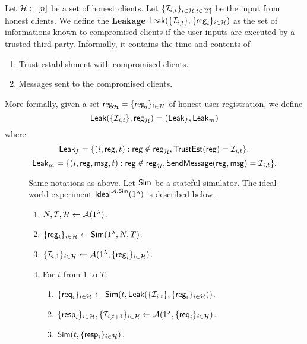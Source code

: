 \begin{definition}[Leakage]
Let $\mathcal{H} \subset [n]$ be a set of honest clients. Let $\{\mathcal{I}_{i, t}\}_{i \in \mathcal{H}, t \in [T]}$ be the input from honest clients. We define the \textbf{Leakage} $\mathsf{Leak}(\{\mathcal{I}_{i, t}\}, \{\mathsf{reg}_{i}\}_{i \in \mathcal{H}})$ as the set of informations known to compromised clients if the user inputs are executed by a trusted third party. Informally, it contains the time and contents of
\begin{enumerate}
    \item Trust establishment with compromised clients.
    \item Messages sent to the compromised clients.
\end{enumerate}
More formally, given a set $\mathsf{reg}_{\mathcal{H}} = \{\mathsf{reg}_{i}\}_{i \in \mathcal{H}}$ of honest user registration, we define
$$\mathsf{Leak}(\{\mathcal{I}_{i, t}\}, \mathsf{reg}_{\mathcal{H}}) = (\mathsf{Leak}_f, \mathsf{Leak}_m)$$
where
$$\mathsf{Leak}_f = \{(i, \mathsf{reg}, t): \mathsf{reg} \notin \mathsf{reg}_{\mathcal{H}}, \mathsf{TrustEst}(\mathsf{reg}) = \mathcal{I}_{i, t}\}.$$
$$\mathsf{Leak}_m = \{(i, \mathsf{reg}, \mathsf{msg}, t): \mathsf{reg} \notin \mathsf{reg}_{\mathcal{H}}, \mathsf{SendMessage}(\mathsf{reg}, \mathsf{msg}) = \mathcal{I}_{i, t}\}.$$
\end{definition}
\begin{figure}[h!]
\begin{framed}
\begin{definition}
\label{defn:ideal-world}
Same notations as above. Let $\mathsf{Sim}$ be a stateful simulator. The ideal-world experiment $\mathsf{Ideal}^{\mathcal{A}, \mathsf{Sim}}(1^{\lambda})$ is described below.
\begin{enumerate}
\item $N, T, \mathcal{H} \leftarrow \mathcal{A}(1^{\lambda})$.
\item $\{\mathsf{reg}_i\}_{i \in \mathcal{H}} \leftarrow \mathsf{Sim}(1^{\lambda}, N, T)$. 
\item $\{\mathcal{I}_{i, 1}\}_{i \in \mathcal{H}} \leftarrow \mathcal{A}(1^{\lambda}, \{\mathsf{reg}_i\}_{i \in \mathcal{H}})$.
\item For $t$ from $1$ to $T$:
    \begin{enumerate}
    \item  $\{\mathsf{req}_i\}_{i \in \mathcal{H}} \leftarrow \mathsf{Sim}(t, \mathsf{Leak}(\{\mathcal{I}_{i, t}\}, \{\mathsf{reg}_i\}_{i \in \mathcal{H}}))$.
    
    \item $\{\mathsf{resp}_i\}_{i \in \mathcal{H}}, \{\mathcal{I}_{i, t + 1}\}_{i \in \mathcal{H}} \leftarrow \mathcal{A}(1^{\lambda}, \{\mathsf{req}_i\}_{i \in \mathcal{H}})$.
    
    \item $\mathsf{Sim}(t, \{\mathsf{resp}_i\}_{i \in \mathcal{H}})$.
    \end{enumerate}
\end{enumerate}
\end{definition}
\end{framed}
\end{figure}
